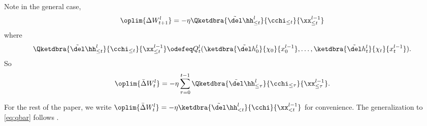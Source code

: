 Note in the general case, 
\[\oplim{\Delta W_{t+1}^l}=-\eta \Qketdbra{\tilde \del \hh^l_{\leq t}}{\cchi_{\leq t}}{\xx^{l-1}_{\leq t}}\]
where \[\Qketdbra{\tilde \del \hh^l_{\leq t}}{\cchi_{\leq t}}{\xx^{l-1}_{\leq t}}\odefeq Q_t^l(\ketdbra{\tilde \del h^l_0}{\chi_0}{x^{l-1}_0}, \ldots, \ketdbra{\tilde \del h^l_t}{\chi_t}{x^{l-1}_t}).\]
So 
\begin{equation}\label{eq:qbar}
    \oplim{\bar\Delta W_t^l}=-\eta \sum_{\tau =0}^{t-1} \Qketdbra{\tilde \del \hh^l_{\leq \tau}}{\cchi_{\leq  \tau}}{\xx^{l-1}_{\leq \tau}}.
\end{equation}

For the rest of the paper, we write $\oplim{\bar \Delta W_t^l}=-\eta \ketdbra{\tilde \del \hh^l_{<t}}{\cchi}{\xx^{l-1}_{<t}}$ for convenience. The generalization to \cref{eq:qbar} follows \citet{yang2023tensor}.

  

